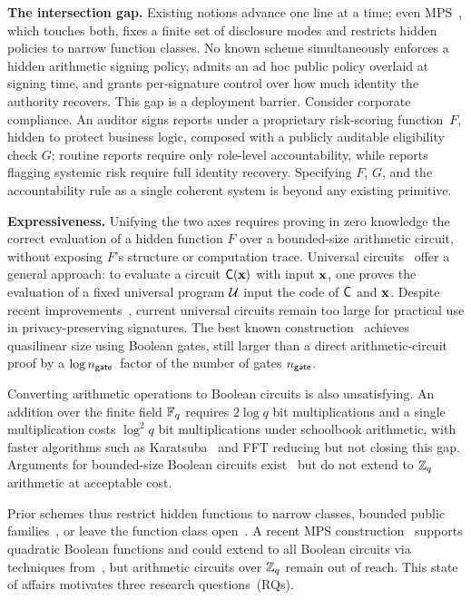 \medskip
\noindent\textbf{The intersection gap.}
Existing notions advance one line at a time;
even MPS~\cite{CRYPTO:NGSY22}, which touches both,
fixes a finite set of disclosure modes and restricts hidden policies to narrow function classes.
No known scheme simultaneously enforces a hidden arithmetic signing policy,
admits an ad hoc public policy overlaid at signing time,
and grants per-signature control over how much identity the authority recovers.
This gap is a deployment barrier.
Consider corporate compliance.
An auditor signs reports under a proprietary risk-scoring function~$F$,
hidden to protect business logic,
composed with a publicly auditable eligibility check $G$;
routine reports require only role-level accountability,
while reports flagging systemic risk require full identity recovery.
Specifying $F$, $G$, and the accountability rule as a single coherent system
is beyond any existing primitive.

\medskip
\noindent\textbf{Expressiveness.}
Unifying the two axes requires proving in zero knowledge
the correct evaluation of a hidden function $F$
over a bounded-size arithmetic circuit,
without exposing $F$'s structure or computation trace.
Universal circuits~\cite{STOC:Valiant76} offer a general approach:
to evaluate a circuit $\mathsf{C}(\mathbf{x})$ with input $\mathbf{x}$, one proves the evaluation of a fixed universal program $\mathcal{U}$
input the code of $\mathsf{C}$ and $\mathbf{x}$.
Despite recent improvements~\cite{EC:KisSch16,EPRINT:LipMohSad16,CRYPTO:LYZZLH21,AC:ZYZL19},
current universal circuits remain too large for practical use in privacy-preserving signatures.
The best known construction~\cite{CRYPTO:LYZZLH21} achieves quasilinear size
using Boolean gates, still larger than a direct arithmetic-circuit proof by a $\log n_\mathsf{gate}$~factor of the number of gates $n_\mathsf{gate}$.

Converting arithmetic operations to Boolean circuits is also unsatisfying.
An addition over the finite field $\mathbb{F}_q$ requires $2\log q$ bit multiplications
and a single multiplication costs $\log^2 q$ bit multiplications under schoolbook arithmetic,
with faster algorithms such as Karatsuba~\cite{karatsuba1962multiplication} and FFT
reducing but not closing this gap.
Arguments for bounded-size Boolean circuits exist~\cite{AC:NRSX23}
but do not extend to $\mathbb{Z}_q$ arithmetic at acceptable cost.

Prior schemes thus restrict hidden functions to narrow classes,
bounded public families~\cite{CRYPTO:NGSY22},
or leave the function class open~\cite{PKC:BoyGolIva14}.
A recent MPS construction~\cite{ACISP:TNLPS24} supports quadratic Boolean functions
and could extend to all Boolean circuits via techniques from~\cite{AC:NRSX23},
but arithmetic circuits over $\mathbb{Z}_q$ remain out of reach.
This state of affairs motivates three research questions~(RQs).

